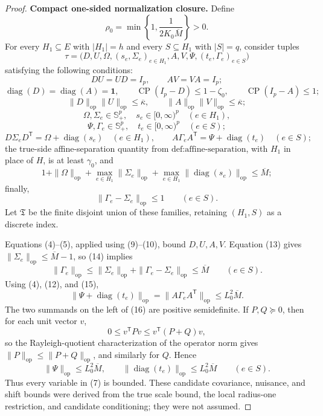 \documentclass{article}
\begin{document}
\begin{proof}
\textbf{Compact one-sided normalization closure.}
Define
\[
\rho_0=\min\left\{1,\frac{1}{2K_0\overline M}\right\}>0.
\tag{6}
\]
For every \(H_1\subseteq E\) with \(|H_1|=h\) and every \(S\subseteq H_1\) with \(|S|=q\), consider tuples
\[
\tau=\bigl(D,U,\Omega,(s_e,\Sigma_e)_{e\in H_1},
A,V,\Psi,(t_e,\Gamma_e)_{e\in S}\bigr)
\tag{7}
\]
satisfying the following conditions:
\[
DU=UD=I_p,
\qquad
AV=VA=I_p;
\tag{8}
\]
\[
\operatorname{diag}(D)=\operatorname{diag}(A)=\mathbf 1,
\qquad
\operatorname{CP}(I_p-D)\leq1-\zeta_0,
\qquad
\operatorname{CP}(I_p-A)\leq1;
\tag{9}
\]
\[
\|D\|_{\mathrm{op}}\|U\|_{\mathrm{op}}
\leq\overline\kappa,
\qquad
\|A\|_{\mathrm{op}}\|V\|_{\mathrm{op}}
\leq\overline\kappa;
\tag{10}
\]
\[
\Omega,\Sigma_e\in\mathbb S_+^p,\quad
s_e\in[0,\infty)^p\quad(e\in H_1),
\]
\[
\Psi,\Gamma_e\in\mathbb S_+^p,\quad
t_e\in[0,\infty)^p\quad(e\in S);
\tag{11}
\]
\[
D\Sigma_eD^{\mathsf T}=\Omega+\operatorname{diag}(s_e)
\quad(e\in H_1),
\qquad
A\Gamma_eA^{\mathsf T}=\Psi+\operatorname{diag}(t_e)
\quad(e\in S);
\tag{12}
\]
the true-side affine-separation quantity from \(\text{def:affine-separation}\), with \(H_1\) in place of \(H\), is at least \(\gamma_0\), and
\[
1+\|\Omega\|_{\mathrm{op}}
+\max_{e\in H_1}\|\Sigma_e\|_{\mathrm{op}}
+\max_{e\in H_1}\|\operatorname{diag}(s_e)\|_{\mathrm{op}}
\leq\overline M;
\tag{13}
\]
finally,
\[
\|\Gamma_e-\Sigma_e\|_{\mathrm{op}}\leq1
\qquad(e\in S).
\tag{14}
\]
Let \(\mathfrak T\) be the finite disjoint union of these families, retaining \((H_1,S)\) as a discrete index.

Equations (4)--(5), applied using (9)--(10), bound \(D,U,A,V\). Equation (13) gives \(\|\Sigma_e\|_{\mathrm{op}}\leq\overline M-1\), so (14) implies
\[
\|\Gamma_e\|_{\mathrm{op}}
\leq\|\Sigma_e\|_{\mathrm{op}}
+\|\Gamma_e-\Sigma_e\|_{\mathrm{op}}
\leq\overline M
\qquad(e\in S).
\tag{15}
\]
Using (4), (12), and (15),
\[
\|\Psi+\operatorname{diag}(t_e)\|_{\mathrm{op}}
=\|A\Gamma_eA^{\mathsf T}\|_{\mathrm{op}}
\leq L_0^2\overline M.
\tag{16}
\]
The two summands on the left of (16) are positive semidefinite. If \(P,Q\succeq0\), then for each unit vector \(v\),
\[
0\leq v^{\mathsf T}Pv\leq v^{\mathsf T}(P+Q)v,
\]
so the Rayleigh-quotient characterization of the operator norm gives \(\|P\|_{\mathrm{op}}\leq\|P+Q\|_{\mathrm{op}}\), and similarly for \(Q\). Hence
\[
\|\Psi\|_{\mathrm{op}}
\leq L_0^2\overline M,
\qquad
\|\operatorname{diag}(t_e)\|_{\mathrm{op}}
\leq L_0^2\overline M
\qquad(e\in S).
\tag{17}
\]
Thus every variable in (7) is bounded. These candidate covariance, nuisance, and shift bounds were derived from the true scale bound, the local radius-one restriction, and candidate conditioning; they were not assumed.


\end{proof}
\end{document}
